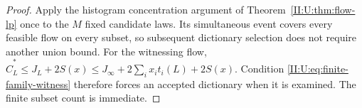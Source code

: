 \begin{proof}
Apply the histogram concentration argument of
Theorem~\ref{II:U:thm:flow-lp} once to the $M$ fixed candidate laws.
Its simultaneous event covers every feasible flow on every subset, so
subsequent dictionary selection does not require another union bound.
For the witnessing flow,
$\widehat C_L^*\le J_L+2S(x)
\le J_\infty+2\sum_i x_it_i(L)+2S(x)$.
Condition \eqref{II:U:eq:finite-family-witness} therefore forces an accepted
dictionary when it is examined. The finite subset count is immediate.
\end{proof}

